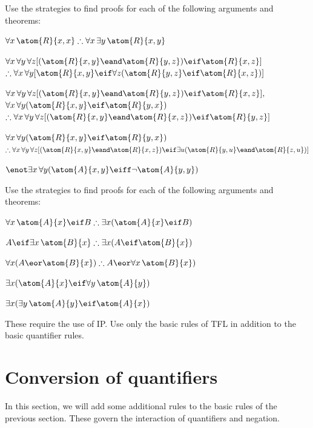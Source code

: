 \problempart
Use the strategies to find proofs for each of the following arguments and theorems:
\begin{compactlist}
\item $\forall x\,\atom{R}{x,x} \therefore \forall x\,\exists y\,\atom{R}{x,y}$
\item $\forall x\,\forall y\,\forall z[(\atom{R}{x,y} \eand \atom{R}{y,z}) \eif \atom{R}{x,z}]$ \\
$\therefore \forall x\,\forall y[\atom{R}{x,y} \eif \forall z(\atom{R}{y,z} \eif \atom{R}{x,z})]$
\item $\forall x\,\forall y\,\forall z[(\atom{R}{x,y} \eand \atom{R}{y,z}) \eif \atom{R}{x,z}],$\\ $\forall x\,\forall y(\atom{R}{x,y} \eif \atom{R}{y, x})$ \\ $\therefore \forall x\,\forall y\,\forall z[(\atom{R}{x,y} \eand \atom{R}{x,z}) \eif \atom{R}{y,z}]$
\item $\forall x\,\forall y(\atom{R}{x,y} \eif \atom{R}{y, x})$ \\$\therefore \forall x\,\forall y\,\forall z[(\atom{R}{x,y} \eand \atom{R}{x,z}) \eif \exists u(\atom{R}{y,u} \eand \atom{R}{z,u})]$
\item $\enot \exists x\,\forall y (\atom{A}{x, y} \eiff \lnot\atom{A}{y, y})$
\end{compactlist}

\problempart
Use the strategies to find proofs for each of the following arguments and theorems:
\begin{compactlist}
\item $\forall x\,\atom{A}{x} \eif B \therefore \exists x(\atom{A}{x} \eif B)$
\item $A \eif \exists x\, \atom{B}{x} \therefore \exists x(A \eif \atom{B}{x})$
\item $\forall x(A \eor \atom{B}{x}) \therefore A \eor \forall x\,\atom{B}{x})$
\item $\exists x(\atom{A}{x} \eif \forall y\,\atom{A}{y})$
\item $\exists x(\exists y\,\atom{A}{y} \eif \atom{A}{x})$
\end{compactlist}
These require the use of IP. Use only the basic rules of TFL in addition to the basic quantifier rules.

\chapter{Conversion of quantifiers}\label{s:CQ}

In this section, we will add some additional rules to the basic rules of the previous section. These govern the interaction of quantifiers and negation.
 
